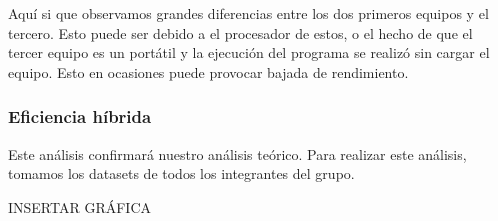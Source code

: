 \documentclass[10pt,a4paper]{article}
\begin{document}
\begin{table}[h!]
	\centering
	\footnotesize
		\hspace{2cm}
		\hspace{2cm}
		\caption{Experiencia empírica de algoritmo de Hanoi}
\end{table}

Aquí si que observamos grandes diferencias entre los dos primeros equipos y el tercero. Esto puede ser debido a el procesador de estos, o el hecho de que el tercer equipo es un portátil y la ejecución del programa se realizó sin cargar el equipo. Esto en ocasiones puede provocar bajada de rendimiento.

\subsubsection{Eficiencia híbrida}

Este análisis confirmará nuestro análisis teórico. Para realizar este análisis, tomamos los datasets de todos los integrantes del grupo.

INSERTAR GRÁFICA
\end{document}
